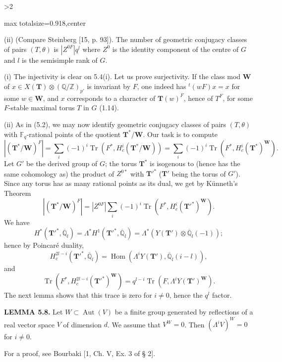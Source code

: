 \documentclass[9pt,twoside]{extarticle}
\newcommand{\EditionPage}[3]{%
  \ifnum#1>2\clearpage\fi
  \pdfbookmark[1]{Printed page #2}{en-folio-#2}%
  \hypertarget{en-physical-#1}{}%
  \noindent\begin{adjustbox}{max totalsize={\textwidth}{0.918\textheight},center}
  \begin{minipage}[t]{\textwidth}
  \fontsize{9.4}{11.1}\selectfont\justifying
  #3
  \end{minipage}
  \end{adjustbox}%
}
\begin{document}
\EditionPage{28}{129}{%
(ii) (Compare Steinberg [15, p. 93]). The number of geometric conjugacy classes of pairs \((T,\theta)\) is \(|Z^{0F}|q^l\) where \(Z^0\) is the identity component of the centre of \(G\) and \(l\) is the semisimple rank of \(G\).\par

(i) The injectivity is clear on 5.4(i). Let us prove surjectivity. If the class mod \(\mathbf W\) of \(x\in X(\mathbf T)\otimes(\mathbb Q/\mathbb Z)_{p'}\) is invariant by \(F\), one indeed has \({}^t(wF)x=x\) for some \(w\in\mathbf W\), and \(x\) corresponds to a character of \(\mathbf T(w)^F\), hence of \(T^F\), for some \(F\)-stable maximal torus \(T\) in \(G\) (1.14).\par

(ii) As in (5.2), we may now identify geometric conjugacy classes of pairs \((T,\theta)\) with \(\mathbb F_q\)-rational points of the quotient \(\mathbf T^*/\mathbf W\). Our task is to compute \[
|(\mathbf T^*/\mathbf W)^F|
=
\sum_i(-1)^i\operatorname{Tr}(F^*,H_c^i(\mathbf T^*/\mathbf W))
=
\sum_i(-1)^i\operatorname{Tr}(F^*,H_c^i(\mathbf T^*)^{\mathbf W}).
\] Let \(G'\) be the derived group of \(G\); the torus \(\mathbf T^*\) is isogenous to (hence has the same cohomology as) the product of \(Z^{0*}\) with \(\mathbf T'^*\) (\(\mathbf T'\) being the torus of \(G'\)). Since any torus has as many rational points as its dual, we get by Künneth's Theorem \[
|(\mathbf T^*/\mathbf W)^F|
=
|Z^{0F}|\sum_i(-1)^i\operatorname{Tr}(F^*,H_c^i(\mathbf T'^*)^{\mathbf W}).
\] We have \[
H^*(\mathbf T'^*,\overline{\mathbb Q}_l)
=
\Lambda^*H^1(\mathbf T'^*,\overline{\mathbb Q}_l)
=
\Lambda^*(Y(\mathbf T')\otimes\overline{\mathbb Q}_l(-1));
\] hence by Poincaré duality, \[
H_c^{2l-i}(\mathbf T'^*,\overline{\mathbb Q}_l)
=
\operatorname{Hom}(\Lambda^iY(\mathbf T'),\overline{\mathbb Q}_l(i-l)),
\] and \[
\operatorname{Tr}(F^*,H_c^{2l-i}(\mathbf T'^*)^{\mathbf W})
=
q^{l-i}\operatorname{Tr}(F,\Lambda^iY(\mathbf T')^{\mathbf W}).
\] The next lemma shows that this trace is zero for \(i\ne0\), hence the \(q^l\) factor.\par

\noindent\textbf{LEMMA 5.8.} Let \(W\subset\operatorname{Aut}(V)\) be a finite group generated by reflections of a real vector space \(V\) of dimension \(d\). We assume that \(V^W=0\). Then \((\Lambda^iV)^W=0\) for \(i\ne0\).\par

For a proof, see Bourbaki [1, Ch. V, Ex. 3 of § 2].\par

}
\end{document}
